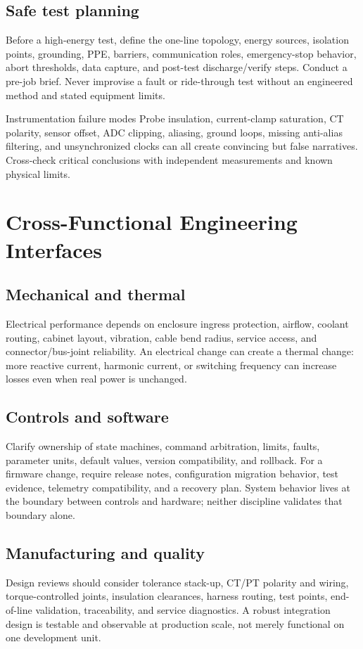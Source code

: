 \documentclass[11pt]{article}
\begin{document}
\subsection{Safe test planning}
Before a high-energy test, define the one-line topology, energy sources,
isolation points, grounding, PPE, barriers, communication roles, emergency-stop
behavior, abort thresholds, data capture, and post-test discharge/verify steps.
Conduct a pre-job brief. Never improvise a fault or ride-through test without an
engineered method and stated equipment limits.

\begin{warningbox}{Instrumentation failure modes}
Probe insulation, current-clamp saturation, CT polarity, sensor offset, ADC
clipping, aliasing, ground loops, missing anti-alias filtering, and
unsynchronized clocks can all create convincing but false narratives.
Cross-check critical conclusions with independent measurements and known
physical limits.
\end{warningbox}

\section{Cross-Functional Engineering Interfaces}

\subsection{Mechanical and thermal}
Electrical performance depends on enclosure ingress protection, airflow,
coolant routing, cabinet layout, vibration, cable bend radius, service access,
and connector/bus-joint reliability. An electrical change can create a thermal
change: more reactive current, harmonic current, or switching frequency can
increase losses even when real power is unchanged.

\subsection{Controls and software}
Clarify ownership of state machines, command arbitration, limits, faults,
parameter units, default values, version compatibility, and rollback. For a
firmware change, require release notes, configuration migration behavior, test
evidence, telemetry compatibility, and a recovery plan. System behavior lives
at the boundary between controls and hardware; neither discipline validates that
boundary alone.

\subsection{Manufacturing and quality}
Design reviews should consider tolerance stack-up, CT/PT polarity and wiring,
torque-controlled joints, insulation clearances, harness routing, test points,
end-of-line validation, traceability, and service diagnostics. A robust
integration design is testable and observable at production scale, not merely
functional on one development unit.
\end{document}
